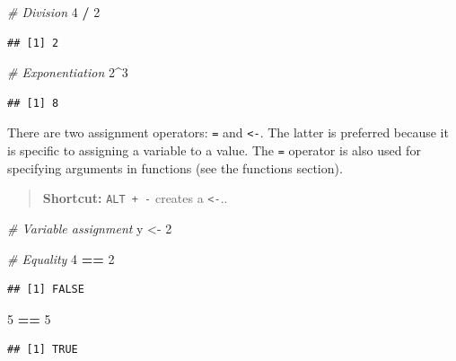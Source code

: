 \documentclass[openany]{book}
\newenvironment{Shaded}{\begin{snugshade}}{\end{snugshade}}
\newcommand{\CommentTok}[1]{\textcolor[rgb]{0.56,0.35,0.01}{\textit{#1}}}
\newcommand{\DecValTok}[1]{\textcolor[rgb]{0.00,0.00,0.81}{#1}}
\newcommand{\NormalTok}[1]{#1}
\newcommand{\OperatorTok}[1]{\textcolor[rgb]{0.81,0.36,0.00}{\textbf{#1}}}
\newcommand{\StringTok}[1]{\textcolor[rgb]{0.31,0.60,0.02}{#1}}
\begin{document}
\begin{Shaded}
\begin{Highlighting}[]
\CommentTok{# Division}
\DecValTok{4} \OperatorTok{/}\StringTok{ }\DecValTok{2}
\end{Highlighting}
\end{Shaded}

\begin{verbatim}
## [1] 2
\end{verbatim}

\begin{Shaded}
\begin{Highlighting}[]
\CommentTok{# Exponentiation}
\DecValTok{2}\OperatorTok{^}\DecValTok{3}
\end{Highlighting}
\end{Shaded}

\begin{verbatim}
## [1] 8
\end{verbatim}

There are two assignment operators: \texttt{=} and \texttt{\textless{}-}. The latter is preferred because
it is specific to assigning a variable to a value. The \texttt{=} operator is also used
for specifying arguments in functions (see the functions section).

\begin{quote}
\textbf{Shortcut:} \texttt{ALT\ +\ -} creates a \texttt{\textless{}-}..
\end{quote}

\begin{Shaded}
\begin{Highlighting}[]
\CommentTok{# Variable assignment}
\NormalTok{y <-}\StringTok{ }\DecValTok{2}

\CommentTok{# Equality}
\DecValTok{4} \OperatorTok{==}\StringTok{ }\DecValTok{2}
\end{Highlighting}
\end{Shaded}

\begin{verbatim}
## [1] FALSE
\end{verbatim}

\begin{Shaded}
\begin{Highlighting}[]
\DecValTok{5} \OperatorTok{==}\StringTok{ }\DecValTok{5}
\end{Highlighting}
\end{Shaded}

\begin{verbatim}
## [1] TRUE
\end{verbatim}
\end{document}
